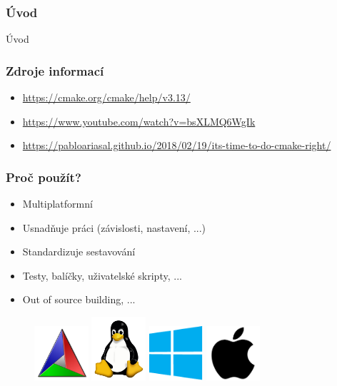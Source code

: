 \begin{frame}
\frametitle{Úvod}
\begin{center}
\Huge {\color{white}Úvod}
\end{center}
\end{frame}

\begin{frame}
\frametitle{Zdroje informací}
	\begin{itemize}
  \item \url{https://cmake.org/cmake/help/v3.13/}
  \item \url{https://www.youtube.com/watch?v=bsXLMQ6WgIk}
  \item \url{https://pabloariasal.github.io/2018/02/19/its-time-to-do-cmake-right/}
	\end{itemize}
\end{frame}

\begin{frame}
\frametitle{Proč použít?}
	\begin{itemize}
	\item Multiplatformní
  \item Usnadňuje práci (závislosti, nastavení, ...)
  \item Standardizuje sestavování
  \item Testy, balíčky, uživatelské skripty, ...
  \item Out of source building, ...
	\end{itemize}
	\begin{figure}[h]
	\includegraphics[width=2cm,keepaspectratio]{pics/introduction/Cmake}
	\includegraphics[width=2cm,keepaspectratio]{pics/introduction/Tux}
	\includegraphics[width=2cm,keepaspectratio]{pics/introduction/Windows}
	\includegraphics[width=2cm,keepaspectratio]{pics/introduction/Apple}
	\end{figure}
\end{frame}

